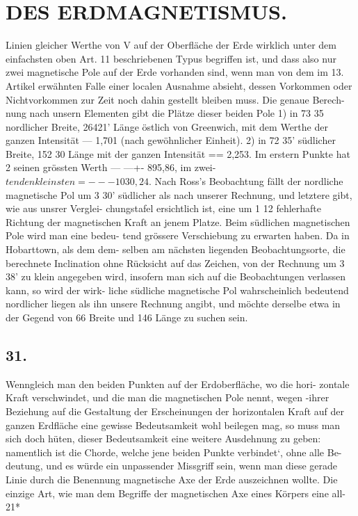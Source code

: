 \documentclass[12pt,a4paper]{article}
\begin{document}
\newpage


\section*{DES ERDMAGNETISMUS.}
Linien gleicher Werthe von V auf der Oberfläche der Erde wirklich unter dem einfachsten oben Art. 11 beschriebenen Typus begriffen ist, und dass also nur zwei magnetische Pole auf der Erde vorhanden sind, wenn man von dem im 13. Artikel erwähnten Falle einer localen Ausnahme absieht, dessen Vorkommen oder Nichtvorkommen zur Zeit noch dahin gestellt bleiben muss. Die genaue Berech- nung nach unsern Elementen gibt die Plätze dieser beiden Pole 1) in 73\textdegree{} 35\textdegree{} nordlicher Breite, 264\textdegree{}21' Länge östlich von Greenwich, mit dem Werthe der ganzen Intensität --- 1,701 (nach gewöhnlicher Einheit). 2) in 72\textdegree{} 35' südlicher Breite, 152\textdegree{} 30\textdegree{} Länge mit der ganzen Intensität == 2,253. Im erstern Punkte hat 2 seinen grössten Werth --- ---+- 895,86, im zwei-
$ten den kleinsten = ---1030,24.$
Nach Ross's Beobachtung fällt der nordliche magnetische Pol um 3\textdegree{} 30' südlicher als nach unserer Rechnung, und letztere gibt, wie aus unsrer Verglei- chungstafel ersichtlich ist, eine um 1\textdegree{} 12\textdegree{} fehlerhafte Richtung der magnetischen Kraft an jenem Platze. Beim südlichen magnetischen Pole wird man eine bedeu- tend grössere Verschiebung zu erwarten haben. Da in Hobarttown, als dem dem- selben am nächsten liegenden Beobachtungsorte, die berechnete Inclination ohne Rücksicht auf das Zeichen, von der Rechnung um 3\textdegree{} 38' zu klein angegeben wird, insofern man sich auf die Beobachtungen verlassen kann, so wird der wirk- liche südliche magnetische Pol wahrscheinlich bedeutend nordlicher liegen als ihn unsere Rechnung angibt, und möchte derselbe etwa in der Gegend von 66\textdegree{} Breite und 146\textdegree{} Länge zu suchen sein.

\subsection*{31.}
Wenngleich man den beiden Punkten auf der Erdoberfläche, wo die hori- zontale Kraft verschwindet, und die man die magnetischen Pole nennt, wegen -ihrer Beziehung auf die Gestaltung der Erscheinungen der horizontalen Kraft auf der ganzen Erdfläche eine gewisse Bedeutsamkeit wohl beilegen mag, so muss man sich doch hüten, dieser Bedeutsamkeit eine weitere Ausdehnung zu geben: namentlich ist die Chorde, welche jene beiden Punkte verbindet`, ohne alle Be- deutung, und es würde ein unpassender Missgriff sein, wenn man diese gerade Linie durch die Benennung magnetische Axe der Erde auszeichnen wollte. Die einzige Art, wie man dem Begriffe der magnetischen Axe eines Körpers eine all- 21*
\end{document}
